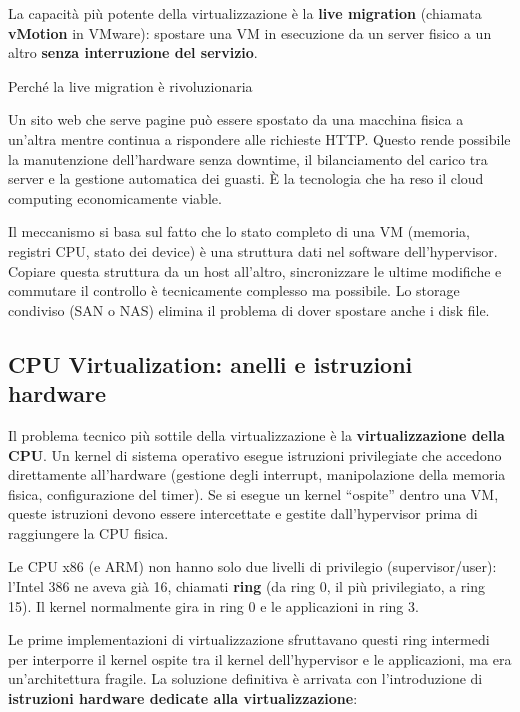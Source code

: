 \documentclass[
  italian,
  openany]{book}
\begin{document}
La capacità più potente della virtualizzazione è la \textbf{live
migration} (chiamata \textbf{vMotion} in VMware): spostare una VM in
esecuzione da un server fisico a un altro \textbf{senza interruzione del
servizio}.

\begin{callouttip}{Perché la live migration è rivoluzionaria}

Un sito web che serve pagine può essere spostato da una macchina fisica
a un'altra mentre continua a rispondere alle richieste HTTP. Questo
rende possibile la manutenzione dell'hardware senza downtime, il
bilanciamento del carico tra server e la gestione automatica dei guasti.
È la tecnologia che ha reso il cloud computing economicamente viable.

\end{callouttip}

Il meccanismo si basa sul fatto che lo stato completo di una VM
(memoria, registri CPU, stato dei device) è una struttura dati nel
software dell'hypervisor. Copiare questa struttura da un host all'altro,
sincronizzare le ultime modifiche e commutare il controllo è
tecnicamente complesso ma possibile. Lo storage condiviso (SAN o NAS)
elimina il problema di dover spostare anche i disk file.

\subsection{CPU Virtualization: anelli e istruzioni
hardware}\label{cpu-virtualization-anelli-e-istruzioni-hardware}

Il problema tecnico più sottile della virtualizzazione è la
\textbf{virtualizzazione della CPU}. Un kernel di sistema operativo
esegue istruzioni privilegiate che accedono direttamente all'hardware
(gestione degli interrupt, manipolazione della memoria fisica,
configurazione del timer). Se si esegue un kernel ``ospite'' dentro una
VM, queste istruzioni devono essere intercettate e gestite
dall'hypervisor prima di raggiungere la CPU fisica.

Le CPU x86 (e ARM) non hanno solo due livelli di privilegio
(supervisor/user): l'Intel 386 ne aveva già 16, chiamati \textbf{ring}
(da ring 0, il più privilegiato, a ring 15). Il kernel normalmente gira
in ring 0 e le applicazioni in ring 3.

Le prime implementazioni di virtualizzazione sfruttavano questi ring
intermedi per interporre il kernel ospite tra il kernel dell'hypervisor
e le applicazioni, ma era un'architettura fragile. La soluzione
definitiva è arrivata con l'introduzione di \textbf{istruzioni hardware
dedicate alla virtualizzazione}:
\end{document}
